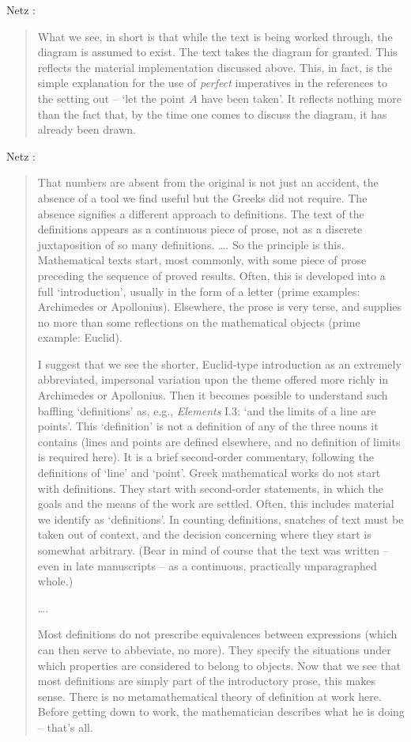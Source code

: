 \documentclass{article}
\begin{document}
Netz \cite[p.~25]{netz}:

\begin{quote}
What we see, in short is that while the text is being worked through,
the diagram is assumed to exist. The text takes the diagram for granted.
This reflects the material implementation discussed above. This, in
fact, is the simple explanation for the use of {\em perfect} imperatives in the
references to the setting out -- `let the point $A$ have been taken'. It
reflects nothing more than the fact that, by the time one comes to
discuss the diagram, it has already been drawn.
\end{quote}

Netz \cite[pp.~94--95]{netz}:

\begin{quote}
That numbers are absent from the original is not just an accident,
the absence of a tool we find useful but the Greeks did not require.
The absence signifies a different approach to definitions. The text of
the definitions appears as a continuous piece of prose, not as a discrete
juxtaposition of so many definitions. \dots. So the principle
is this. Mathematical texts start, most commonly, with some piece of
prose preceding the sequence of proved results. Often, this is developed
into a full `introduction', usually in the form of a letter (prime
examples: Archimedes or Apollonius). Elsewhere, the prose is very
terse, and supplies no more than some reflections on the mathematical
objects (prime example: Euclid).

I suggest that we see the shorter, Euclid-type introduction as an
extremely abbreviated, impersonal variation upon the theme offered
more richly in Archimedes or Apollonius. Then it becomes possible to 
understand such baffling `definitions' as, e.g., {\em Elements} I.3: `and the
limits of a line are points'. This `definition' is not a definition of any
of the three nouns it contains (lines and points are defined elsewhere,
and no definition of limits is required here). It is a brief second-order
commentary, following the definitions of `line' and `point'. Greek 
mathematical works do not start with definitions. They start with
second-order statements, in which the goals and the means of the work are
settled. Often, this includes material we identify as `definitions'. In
counting definitions, snatches of text must be taken out of context, and
the decision concerning where they start is somewhat arbitrary. (Bear 
in mind of course that the text was written -- even in late manuscripts -- 
as a continuous, practically unparagraphed whole.)

\dots.

Most definitions do not prescribe equivalences
between expressions (which can then serve to abbeviate, no more).
They specify the situations under which properties are considered to
belong to objects. Now that we see that most definitions are simply
part of the introductory prose, this makes sense. There is no metamathematical
theory of definition at work here. Before getting down to
work, the mathematician describes what he is doing -- that's all.
\end{quote}
\end{document}
